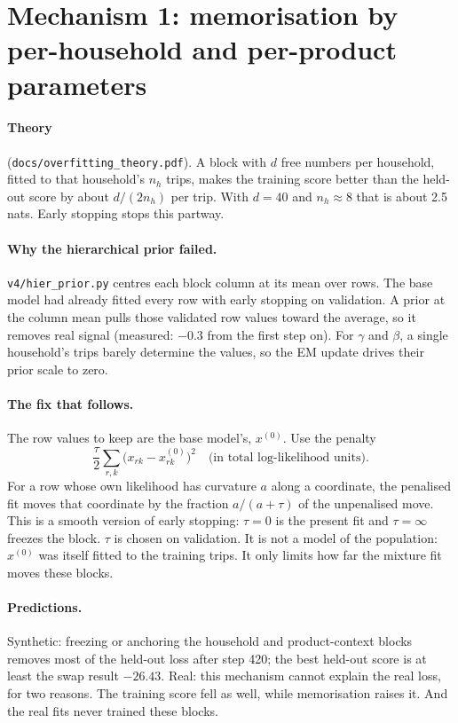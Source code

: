 \documentclass[11pt]{article}
\theoremstyle{remark}\newtheorem{remark}{Remark}
\begin{document}
\section{Mechanism 1: memorisation by per-household and per-product parameters}\label{sec:mem}

\paragraph{Theory} (\texttt{docs/overfitting\_theory.pdf}). A block with $d$ free numbers per
household, fitted to that household's $n_h$ trips, makes the training score better than the
held-out score by about $d/(2n_h)$ per trip. With $d=40$ and $n_h\approx 8$ that is about 2.5
nats. Early stopping stops this partway.

\paragraph{Why the hierarchical prior failed.}
\texttt{v4/hier\_prior.py} centres each block column at its mean over rows. The base model had
already fitted every row with early stopping on validation. A prior at the column mean pulls
those validated row values toward the average, so it removes real signal (measured: $-0.3$ from
the first step on). For $\gamma$ and $\beta$, a single household's trips barely determine the
values, so the EM update drives their prior scale to zero.

\paragraph{The fix that follows.} The row values to keep are the base model's,
$x^{(0)}$. Use the penalty
\begin{equation}\label{eq:anchor}
\frac{\tau}{2}\sum_{r,k}\bigl(x_{rk}-x^{(0)}_{rk}\bigr)^2 \quad\text{(in total log-likelihood units)}.
\end{equation}
For a row whose own likelihood has curvature $a$ along a coordinate, the penalised fit moves that
coordinate by the fraction $a/(a+\tau)$ of the unpenalised move. This is a smooth version of early
stopping: $\tau=0$ is the present fit and $\tau=\infty$ freezes the block. $\tau$ is chosen on
validation. It is not a model of the population: $x^{(0)}$ was itself fitted to the training
trips. It only limits how far the mixture fit moves these blocks.

\paragraph{Predictions.} Synthetic: freezing or anchoring the household and product-context
blocks removes most of the held-out loss after step 420; the best held-out score is at least
the swap result $-26.43$. Real: this mechanism cannot explain the real loss, for two reasons. The
training score fell as well, while memorisation raises it. And the real fits never trained these
blocks.
\end{document}

